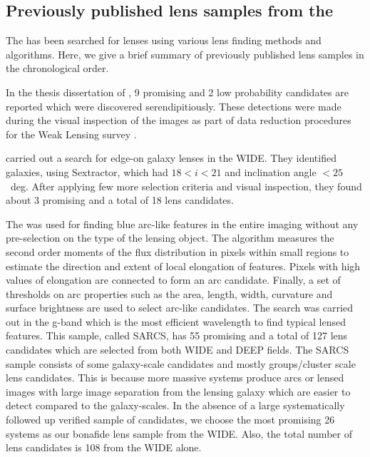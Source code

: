 \documentclass[useAMS,usenatbib,a4paper]{mn2e}
\begin{document}
\subsection{Previously published lens samples from the \cfhtls}
\label{sec:data:kls}

The \cfhtls has been searched for lenses using various lens finding
methods and algorithms. Here, we give a brief summary of previously published lens
samples in the chronological order.

In the thesis dissertation of \citet{Thanjavur2009}, 9 promising and 2
low probability candidates are reported which were discovered
serendipitiously. These detections were made during the visual
inspection of the \cfhtls images as part of data reduction procedures
for the Weak Lensing survey \citep{Benjamin2007}.

\citet{Sygnet2010} carried out a search for edge-on galaxy lenses in the
\cfhtls WIDE. They identified galaxies, using {\sc Sextractor}, which
had $18<i<21$ and inclination angle $<25$~deg. After applying few more
selection criteria and visual inspection, they found about 3 promising
and a total of 18 lens candidates.

The \af \citep{More2012} was used for finding blue arc-like features in
the entire \cfhtls imaging without any pre-selection on the type of the lensing
object. The algorithm measures the second order moments of the flux distribution
in pixels within small regions to estimate the direction and extent of local
elongation of features. Pixels with high values of elongation are connected to
form an arc candidate. Finally, a set of thresholds on arc properties such as
the area, length, width, curvature and surface brightness are used to select
arc-like candidates. The search was carried out in the g-band which is the most
efficient wavelength to find typical lensed features.  This sample, called
SARCS, has 55 promising and a total of 127 lens candidates which are selected
from both \cfhtls WIDE and DEEP fields. The SARCS sample consists of some
galaxy-scale candidates and mostly groups/cluster scale lens candidates. This is
because more massive systems produce arcs or lensed images with large image
separation from the lensing galaxy which are easier to detect compared to the
galaxy-scales. In the absence of a large systematically followed up
verified sample of candidates, we choose the most promising 26 systems
as our bonafide lens sample from the \cfhtls WIDE. Also, the total
number of lens candidates is 108 from the \cfhtls WIDE alone. 
\end{document}
